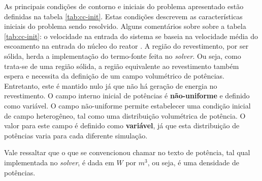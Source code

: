 As principais condições de contorno e iniciais do problema apresentado estão definidas na tabela \ref{tab:cc-init}.
Estas condições descrevem as características iniciais do problema sendo resolvido. Alguns comentários sobre sobre
a tabela \ref{tab:cc-init}: o velocidade na entrada do sistema se baseia na velocidade média do escoamento na
entrada do núcleo do reator \cite{Veloso2005}. A região do revestimento, por ser sólida, herda a implementação
do termo-fonte feita no \textit{solver}. Ou seja, como trata-se de uma região sólida, a região equivalente ao
revestimento também espera e necessita da definição de um campo volumétrico de potências.
Entretanto, este é mantido nulo já que não há geração de energia no revestimento. O campo
interno inicial de potências é \textbf{não-uniforme} e definido como variável. O campo não-uniforme permite estabelecer
uma condição inicial de campo heterogêneo, tal como uma distribuição volumétrica de potência. O valor para este
campo é definido como \textbf{variável}, já que esta distribuição de potências varia para cada diferente simulação.

Vale ressaltar que o que se convencionou chamar no texto de potência, tal qual implementada no \textit{solver}, é dada em $W$ por $m^3$,
ou seja, é uma densidade de potências.

